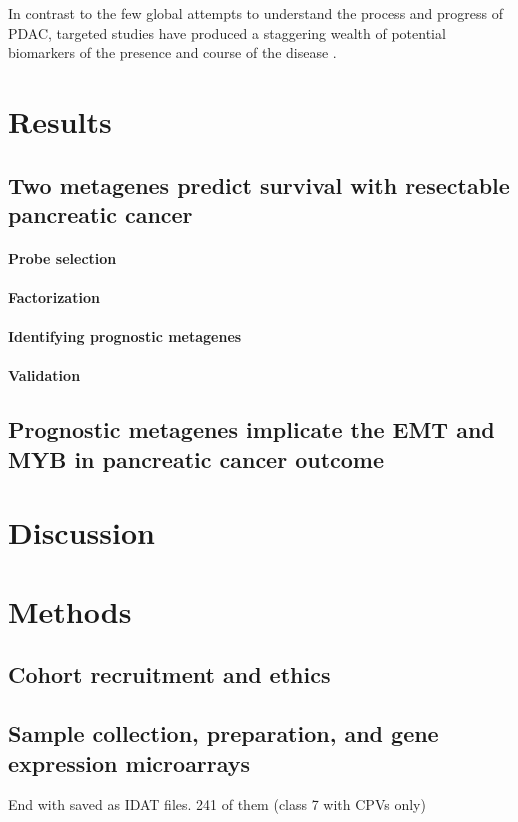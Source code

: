 \documentclass[dissertation.tex]{subfiles}
\begin{document}
In contrast to the few global attempts to understand the process and progress of \gls{PDAC}, targeted studies have produced a staggering wealth of potential biomarkers of the presence and course of the disease \cite{Harsha2009}.

\section{Results}

\subsection{Two metagenes predict survival with resectable pancreatic cancer}
\paragraph{Probe selection}
\paragraph{Factorization}
\paragraph{Identifying prognostic metagenes}
\paragraph{Validation}
\subsection{Prognostic metagenes implicate the \acrshort{EMT} and MYB in pancreatic cancer outcome}

\section{Discussion}

\section{Methods}
\subsection{Cohort recruitment and ethics}

\subsection{Sample collection, preparation, and gene expression microarrays}
\mpfatal{}
End with saved as \gls{IDAT} files.  241 of them (class 7 with CPVs only)
\end{document}
